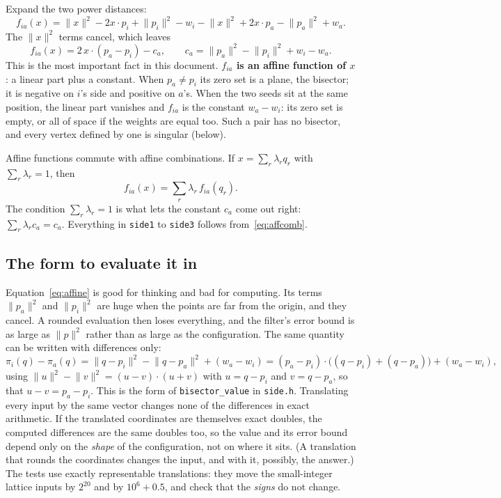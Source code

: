 \documentclass[11pt,a4paper]{article}
\newcommand{\code}[1]{\texttt{#1}}
\newcommand{\norm}[1]{\lVert #1\rVert}
\theoremstyle{remark}
\begin{document}
Expand the two power distances:
\[
  f_{ia}(x) = \norm{x}^2 - 2x\cdot p_i + \norm{p_i}^2 - w_i
            - \norm{x}^2 + 2x\cdot p_a - \norm{p_a}^2 + w_a .
\]
The $\norm{x}^2$ terms cancel, which leaves
\begin{equation}\label{eq:affine}
  f_{ia}(x) = 2\,x\cdot(p_a - p_i) - c_a, \qquad c_a = \norm{p_a}^2 - \norm{p_i}^2 + w_i - w_a .
\end{equation}
This is the most important fact in this document. \textbf{$f_{ia}$ is an affine function of
$x$}: a linear part plus a constant. When $p_a \neq p_i$ its zero set is a plane, the bisector;
it is negative on $i$'s side and positive on $a$'s. When the two seeds sit at the same position,
the linear part vanishes and $f_{ia}$ is the constant $w_a - w_i$: its zero set is empty, or all
of space if the weights are equal too. Such a pair has no bisector, and every vertex defined by
one is singular (below).

Affine functions commute with affine combinations. If $x = \sum_r \lambda_r q_r$ with
$\sum_r \lambda_r = 1$, then
\begin{equation}\label{eq:affcomb}
  f_{ia}(x) = \sum_r \lambda_r\, f_{ia}(q_r).
\end{equation}
The condition $\sum_r\lambda_r = 1$ is what lets the constant $c_a$ come out right:
$\sum_r \lambda_r c_a = c_a$. Everything in \code{side1} to \code{side3} follows
from~\eqref{eq:affcomb}.

\subsection{The form to evaluate it in}

Equation~\eqref{eq:affine} is good for thinking and bad for computing. Its terms
$\norm{p_a}^2$ and $\norm{p_i}^2$ are huge when the points are far from the origin, and they
cancel. A rounded evaluation then loses everything, and the filter's error bound is as large as
$\norm{p}^2$ rather than as large as the configuration. The same quantity can be written with
differences only:
\begin{equation}\label{eq:diffform}
  \pi_i(q) - \pi_a(q) = \norm{q-p_i}^2 - \norm{q-p_a}^2 + (w_a - w_i)
  = (p_a - p_i)\cdot\bigl((q - p_i) + (q - p_a)\bigr) + (w_a - w_i),
\end{equation}
using $\norm{u}^2 - \norm{v}^2 = (u - v)\cdot(u + v)$ with $u = q - p_i$ and $v = q - p_a$, so
that $u - v = p_a - p_i$. This is the form of \code{bisector\_value} in \code{side.h}.
Translating every input by the same vector changes none of the differences in exact arithmetic.
If the translated coordinates are themselves exact doubles, the computed differences are the same
doubles too, so the value and its error bound depend only on the \emph{shape} of the
configuration, not on where it sits. (A translation that rounds the coordinates changes the input,
and with it, possibly, the answer.) The tests use exactly representable translations: they move
the small-integer lattice inputs by $2^{20}$ and by $10^6 + 0.5$, and check that the
\emph{signs} do not change.
\end{document}
